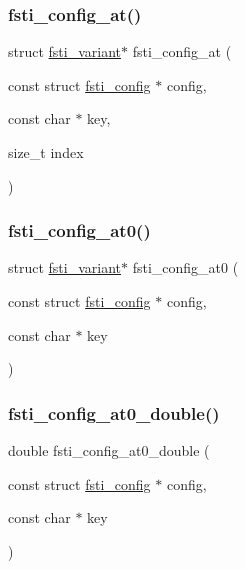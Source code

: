 \subsubsection{\texorpdfstring{fsti\+\_\+config\+\_\+at()}{fsti\_config\_at()}}
{\footnotesize\ttfamily struct \mbox{\hyperlink{structfsti__variant}{fsti\+\_\+variant}}$\ast$ fsti\+\_\+config\+\_\+at (\begin{DoxyParamCaption}\item[{const struct \mbox{\hyperlink{structfsti__config}{fsti\+\_\+config}} $\ast$}]{config,  }\item[{const char $\ast$}]{key,  }\item[{size\+\_\+t}]{index }\end{DoxyParamCaption})}

\mbox{\label{fsti-config_8h_a720dc18f76126042749bd5bab32fcc14}} 
\subsubsection{\texorpdfstring{fsti\+\_\+config\+\_\+at0()}{fsti\_config\_at0()}}
{\footnotesize\ttfamily struct \mbox{\hyperlink{structfsti__variant}{fsti\+\_\+variant}}$\ast$ fsti\+\_\+config\+\_\+at0 (\begin{DoxyParamCaption}\item[{const struct \mbox{\hyperlink{structfsti__config}{fsti\+\_\+config}} $\ast$}]{config,  }\item[{const char $\ast$}]{key }\end{DoxyParamCaption})}

\mbox{\label{fsti-config_8h_a3e479a269882550f86538865a4c76d1e}} 
\subsubsection{\texorpdfstring{fsti\+\_\+config\+\_\+at0\+\_\+double()}{fsti\_config\_at0\_double()}}
{\footnotesize\ttfamily double fsti\+\_\+config\+\_\+at0\+\_\+double (\begin{DoxyParamCaption}\item[{const struct \mbox{\hyperlink{structfsti__config}{fsti\+\_\+config}} $\ast$}]{config,  }\item[{const char $\ast$}]{key }\end{DoxyParamCaption})}

